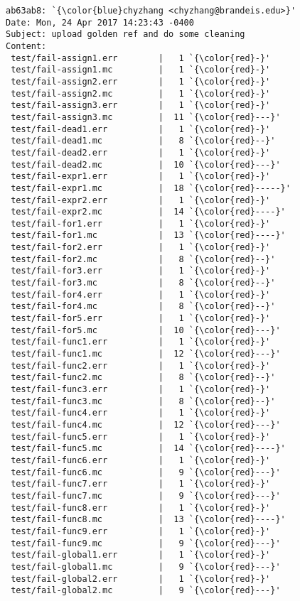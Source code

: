 \begin{lstlisting}
ab63ab8: `{\color{blue}chyzhang <chyzhang@brandeis.edu>}'
Date: Mon, 24 Apr 2017 14:23:43 -0400
Subject: upload golden ref and do some cleaning
Content: 
 test/fail-assign1.err        |   1 `{\color{red}-}'
 test/fail-assign1.mc         |   1 `{\color{red}-}'
 test/fail-assign2.err        |   1 `{\color{red}-}'
 test/fail-assign2.mc         |   1 `{\color{red}-}'
 test/fail-assign3.err        |   1 `{\color{red}-}'
 test/fail-assign3.mc         |  11 `{\color{red}---}'
 test/fail-dead1.err          |   1 `{\color{red}-}'
 test/fail-dead1.mc           |   8 `{\color{red}--}'
 test/fail-dead2.err          |   1 `{\color{red}-}'
 test/fail-dead2.mc           |  10 `{\color{red}---}'
 test/fail-expr1.err          |   1 `{\color{red}-}'
 test/fail-expr1.mc           |  18 `{\color{red}-----}'
 test/fail-expr2.err          |   1 `{\color{red}-}'
 test/fail-expr2.mc           |  14 `{\color{red}----}'
 test/fail-for1.err           |   1 `{\color{red}-}'
 test/fail-for1.mc            |  13 `{\color{red}----}'
 test/fail-for2.err           |   1 `{\color{red}-}'
 test/fail-for2.mc            |   8 `{\color{red}--}'
 test/fail-for3.err           |   1 `{\color{red}-}'
 test/fail-for3.mc            |   8 `{\color{red}--}'
 test/fail-for4.err           |   1 `{\color{red}-}'
 test/fail-for4.mc            |   8 `{\color{red}--}'
 test/fail-for5.err           |   1 `{\color{red}-}'
 test/fail-for5.mc            |  10 `{\color{red}---}'
 test/fail-func1.err          |   1 `{\color{red}-}'
 test/fail-func1.mc           |  12 `{\color{red}---}'
 test/fail-func2.err          |   1 `{\color{red}-}'
 test/fail-func2.mc           |   8 `{\color{red}--}'
 test/fail-func3.err          |   1 `{\color{red}-}'
 test/fail-func3.mc           |   8 `{\color{red}--}'
 test/fail-func4.err          |   1 `{\color{red}-}'
 test/fail-func4.mc           |  12 `{\color{red}---}'
 test/fail-func5.err          |   1 `{\color{red}-}'
 test/fail-func5.mc           |  14 `{\color{red}----}'
 test/fail-func6.err          |   1 `{\color{red}-}'
 test/fail-func6.mc           |   9 `{\color{red}---}'
 test/fail-func7.err          |   1 `{\color{red}-}'
 test/fail-func7.mc           |   9 `{\color{red}---}'
 test/fail-func8.err          |   1 `{\color{red}-}'
 test/fail-func8.mc           |  13 `{\color{red}----}'
 test/fail-func9.err          |   1 `{\color{red}-}'
 test/fail-func9.mc           |   9 `{\color{red}---}'
 test/fail-global1.err        |   1 `{\color{red}-}'
 test/fail-global1.mc         |   9 `{\color{red}---}'
 test/fail-global2.err        |   1 `{\color{red}-}'
 test/fail-global2.mc         |   9 `{\color{red}---}'

\end{lstlisting}
